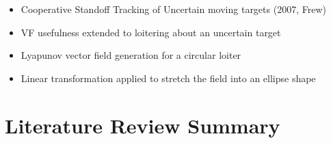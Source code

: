 \documentclass[numbered,pdftex]{ohio-etd}
\begin{document}
\begin{itemize}
	\item Cooperative Standoff Tracking of Uncertain moving targets (2007, Frew)
	\item VF usefulness extended to loitering about an uncertain target
	\item Lyapunov vector field generation for a circular loiter
	\item Linear transformation applied to stretch the field into an ellipse shape
\end{itemize}





\section{Literature Review Summary}

   

\end{document}

